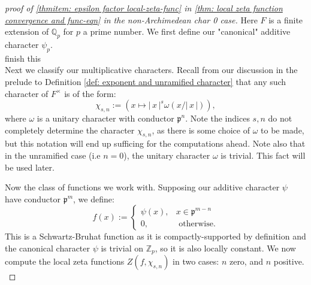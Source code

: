 \documentclass[11pt, x11names, openany]{book}
\newcommand{\zz}{\mathbb{Z}}
\newcommand{\qq}{\mathbb{Q}}
\newcommand{\pp}{\mathfrak{p}}
\renewcommand{\brack}[1]{\left(   #1 \right)}
\newcommand{\abs}[1]{\left| \, #1  \,\right|}
\begin{document}
\begin{proof}[proof of \ref{thmitem: epsilon factor local-zeta-func} in \ref{thm: local zeta function convergence and func-eqn} in the non-Archimedean char 0 case]
Here $F$ is a finite extension of $\qq_p$ for $p$ a prime number. We first define our "canonical" additive character $\psi_p$.\\
 finish this\\

Next we classify our multiplicative characters. Recall from our discussion in the prelude to Definition \ref{def: exponent and unramified character} that any such character of $F^\times$ is of the form:
\begin{equation*}
    \chi_{s, n} := \brack{x \mapsto \abs{x}^s \omega(x/\abs{x})},
\end{equation*}
where $\omega$ is a unitary character with conductor $\pp^n$. Note the indices $s, n$ do not completely determine the character $\chi_{s, n}$, as there is some choice of $\omega$ to be made, but this notation will end up sufficing for the computations ahead. Note also that in the unramified case (i.e $n=0$), the unitary character $\omega$ is trivial. This fact will be used later.

Now the class of functions we work with. Supposing our additive character $\psi$ have conductor $\pp^m$, we define:
\begin{equation*}
    f(x) := \begin{cases}
        \psi(x), & x \in \pp^{m-n}\\
        0, & \text{ otherwise}.
    \end{cases}
\end{equation*}
This is a Schwartz-Bruhat function as it is compactly-supported by definition and the canonical character $\psi$ is trivial on $\zz_p$, so it is also locally constant. We now compute the local zeta functions $Z(f, \chi_{s, n})$ in two cases: $n$ zero, and $n$ positive.\\


\end{proof}
\end{document}
